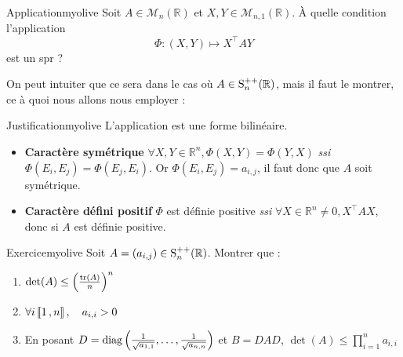     \begin{omed}{Application}{myolive}
        Soit $A \in \mathcal{M}_n(\mathbb{R})$ et $X,Y \in \mathcal{M}_{n,1}(\mathbb{R})$. À quelle condition l’application
        \[ \Phi : (X,Y) \longmapsto X^{\top} A Y \]   
        est un spr ?
    \end{omed}

    On peut intuiter que ce sera dans le cas où $A \in \S^{++}_n(\mathbb{R})$, mais il faut le montrer, ce à quoi nous allons nous employer :

    \begin{demo}{Justification}{myolive}
        L’application est une forme bilinéaire. 
        \begin{itemize}
            \item \textbf{Caractère symétrique} \quad $\forall X,Y \in \mathbb{R}^n, \Phi(X,Y) = \Phi(Y,X)$ \textit{ssi} $\Phi(E_i, E_j) = \Phi(E_j, E_i)$. Or $\Phi(E_i,E_j) = a_{i,j}$, il faut donc que $A$ soit symétrique.
            \item \textbf{Caractère défini positif} $\Phi$ est définie positive \textit{ssi}  $\forall X \in \mathbb{R}^n \neq 0, X^{\top} A X$, donc si $A$ est définie positive.
        \end{itemize}
    \end{demo}

    \begin{omed}{Exercice}{myolive}
        Soit $A = (a_{i,j}) \in \S_n^{++}(\mathbb{R})$. Montrer que :
        \begin{enumerate}
            \item $\det(A) \leq \left(\frac{\tr(A)}{n}\right)^n$ 
            \item $\forall i \intervalleEntier{1}{n}, \quad a_{i,i} > 0$ 
            \item En posant $D = \diag\left(\frac{1}{\sqrt{a_{1,1}}}, \ldots, \frac{1}{\sqrt{a_{n,n}}}\right)$ et $B = DAD$, $\det(A) \leq \prod_{i=1}^{n} a_{i,i}$
        \end{enumerate}
    \end{omed}

